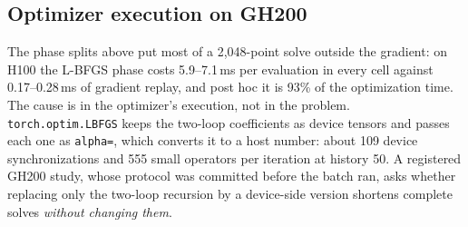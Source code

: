 \documentclass[11pt]{article}
\begin{document}
\subsection{Optimizer execution on GH200}\label{sec:lbfgsgh200}
The phase splits above put most of a 2,048-point solve outside the
gradient: on H100 the L-BFGS phase costs 5.9--7.1\,ms per evaluation in
every cell against 0.17--0.28\,ms of gradient replay, and post hoc it is
93\% of the optimization time. The cause is in the optimizer's execution,
not in the problem. \texttt{torch.optim.LBFGS} keeps the two-loop
coefficients as device tensors and passes each one as \texttt{alpha=},
which converts it to a host number: about 109 device synchronizations and
555 small operators per iteration at history 50. A registered GH200 study,
whose protocol was committed before the batch ran, asks whether replacing
only the two-loop recursion by a device-side version shortens complete
solves \emph{without changing them}.
\end{document}
